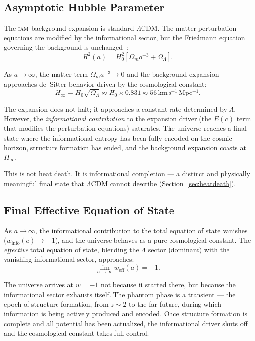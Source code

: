 \documentclass[12pt,letterpaper]{article}
\newcommand{\IAM}{\textsc{iam}}
\newcommand{\LCDM}{$\Lambda$CDM}
\newcommand{\Ea}{E(a)}
\newcommand{\winfo}{w_{\mathrm{info}}(a)}
\newcommand{\weff}{w_{\mathrm{eff}}(a)}
\begin{document}
\subsection{Asymptotic Hubble Parameter}

The \IAM\ background expansion is standard \LCDM. The matter perturbation equations are modified by the informational sector, but the Friedmann equation governing the background is unchanged~\citep{Mahaffey2026_CAMB}:
\begin{equation}
    H^2(a) = H_0^2 \left[\Omega_m a^{-3} + \Omega_\Lambda\right].
    \label{eq:Friedmann}
\end{equation}

As $a \to \infty$, the matter term $\Omega_m a^{-3} \to 0$ and the background expansion approaches de~Sitter behavior driven by the cosmological constant:
\begin{equation}
    H_\infty = H_0 \sqrt{\Omega_\Lambda} \approx H_0 \times 0.831 \approx 56\,\mathrm{km\,s^{-1}\,Mpc^{-1}}.
    \label{eq:Hinf}
\end{equation}

The expansion does not halt; it approaches a constant rate determined by $\Lambda$. However, the \emph{informational contribution} to the expansion driver (the $\Ea$ term that modifies the perturbation equations) saturates. The universe reaches a final state where the informational entropy has been fully encoded on the cosmic horizon, structure formation has ended, and the background expansion coasts at $H_\infty$.

This is not heat death. It is informational completion --- a distinct and physically meaningful final state that $\Lambda$CDM cannot describe (Section~\ref{sec:heatdeath}).

\subsection{Final Effective Equation of State}

As $a \to \infty$, the informational contribution to the total equation of state vanishes ($\winfo \to -1$), and the universe behaves as a pure cosmological constant. The \emph{effective} total equation of state, blending the $\Lambda$ sector (dominant) with the vanishing informational sector, approaches:
\begin{equation}
    \lim_{a \to \infty} \weff = -1.
    \label{eq:wfinal}
\end{equation}

The universe arrives at $w = -1$ not because it started there, but because the informational sector exhausts itself. The phantom phase is a transient --- the epoch of structure formation, from $z \sim 2$ to the far future, during which information is being actively produced and encoded. Once structure formation is complete and all potential has been actualized, the informational driver shuts off and the cosmological constant takes full control.
\end{document}
